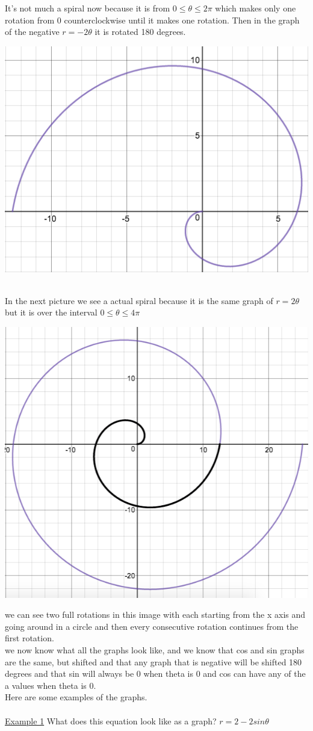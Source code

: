 \documentclass[a4paper,openright, 14pt]{article}
\begin{document}
It's not much a spiral now because it is from $0 \leq \theta \leq 2\pi$ which makes only one rotation from 0 counterclockwise until it makes one rotation. Then in the graph of the negative $r=-2\theta$ it is rotated 180 degrees. 
\begin{center}
    

\includegraphics[width = 7 cm, height = 5 cm]{negspiral.png}
\end{center}
\\In the next picture we see a actual spiral because it is the same graph of $r=2\theta$ but it is over the interval $0 \leq \theta \leq 4\pi$ 
\begin{center}
    

\includegraphics[width = 5.5 cm, height = 5 cm]{bigspiral.png}
\end{center}
we can see two full rotations in this image with each starting from the x axis and going around in a circle and then every consecutive rotation continues from the first rotation.
\\we now know what all the graphs look like, and we know that cos and sin graphs are the same, but shifted and that any graph that is negative will be shifted 180 degrees and that sin will always be 0 when theta is 0 and cos can have any of the a values when theta is 0. 
\\Here are some examples of the graphs.\\
\\\underline{Example 1}
What does this equation look like as a graph? $r=2-2sin\theta$
\end{document}
